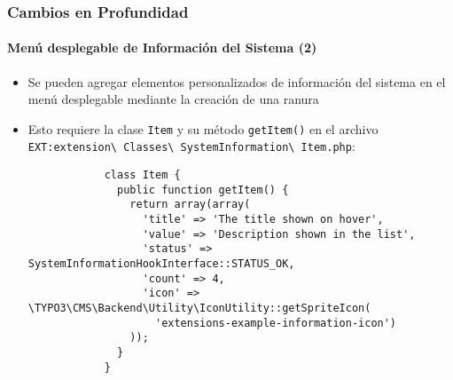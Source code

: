 \begin{frame}[fragile]
	\frametitle{Cambios en Profundidad}
	\framesubtitle{Menú desplegable de Información del Sistema (2)}

	\lstset{basicstyle=\tiny\ttfamily}

	\begin{itemize}

		\item Se pueden agregar elementos personalizados de información del sistema
			en el menú desplegable mediante la creación de una ranura

		\item Esto requiere la clase \texttt{Item} y su método \texttt{getItem()} en el archivo
			\small
				\texttt{EXT:extension\textbackslash
					Classes\textbackslash
					SystemInformation\textbackslash
					Item.php}:
			\normalsize

		\begin{lstlisting}
			class Item {
			  public function getItem() {
			    return array(array(
			      'title' => 'The title shown on hover',
			      'value' => 'Description shown in the list',
			      'status' => SystemInformationHookInterface::STATUS_OK,
			      'count' => 4,
			      'icon' => \TYPO3\CMS\Backend\Utility\IconUtility::getSpriteIcon(
				    'extensions-example-information-icon')
			    ));
			  }
			}
		\end{lstlisting}

	\end{itemize}

\end{frame}

